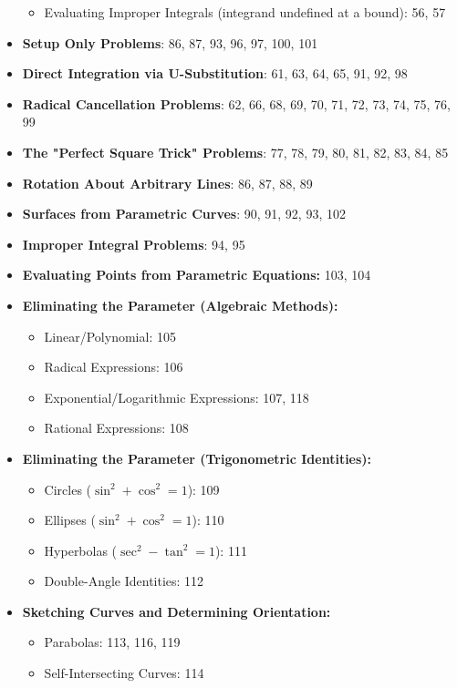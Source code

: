 \documentclass{article}
\begin{document}
\begin{itemize}
\begin{itemize}
        \item Evaluating Improper Integrals (integrand undefined at a bound): 56, 57
    \end{itemize}
    \item \textbf{Setup Only Problems}: 86, 87, 93, 96, 97, 100, 101
    \item \textbf{Direct Integration via U-Substitution}: 61, 63, 64, 65, 91, 92, 98
    \item \textbf{Radical Cancellation Problems}: 62, 66, 68, 69, 70, 71, 72, 73, 74, 75, 76, 99
    \item \textbf{The "Perfect Square Trick" Problems}: 77, 78, 79, 80, 81, 82, 83, 84, 85
    \item \textbf{Rotation About Arbitrary Lines}: 86, 87, 88, 89
    \item \textbf{Surfaces from Parametric Curves}: 90, 91, 92, 93, 102
    \item \textbf{Improper Integral Problems}: 94, 95
	\item \textbf{Evaluating Points from Parametric Equations:} 103, 104
    \item \textbf{Eliminating the Parameter (Algebraic Methods):}
        \begin{itemize}
            \item Linear/Polynomial: 105
            \item Radical Expressions: 106
            \item Exponential/Logarithmic Expressions: 107, 118
            \item Rational Expressions: 108
        \end{itemize}
    \item \textbf{Eliminating the Parameter (Trigonometric Identities):}
        \begin{itemize}
            \item Circles ($\sin^2+\cos^2=1$): 109
            \item Ellipses ($\sin^2+\cos^2=1$): 110
            \item Hyperbolas ($\sec^2-\tan^2=1$): 111
            \item Double-Angle Identities: 112
        \end{itemize}
    \item \textbf{Sketching Curves and Determining Orientation:}
        \begin{itemize}
            \item Parabolas: 113, 116, 119
            \item Self-Intersecting Curves: 114

\end{itemize}
\end{itemize}
\end{document}
